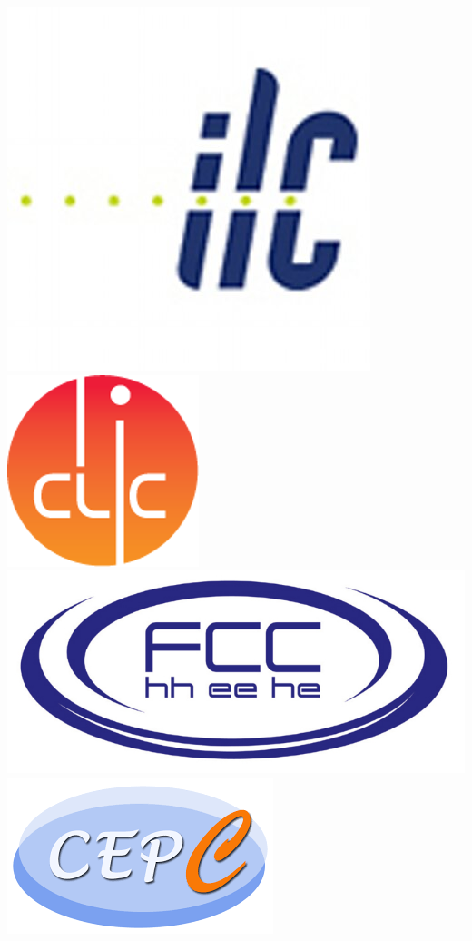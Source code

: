 \documentclass[aspectratio=169]{beamer}
\begin{document}
\begin{frame}
\begin{columns}[c]
    \includegraphics[width=0.4\linewidth]{figures/ilc_logo_400x400.jpg}\\
    \vspace*{-0.5cm}\hspace*{2cm}\includegraphics[width=0.4\linewidth]{figures/CLIC-Logo-Color-72_3_0.png}\\
    \includegraphics[width=0.6\linewidth]{figures/fcc_logo.jpg}\\
    \vspace*{-0.1cm}\hspace*{1.5cm}\includegraphics[width=0.6\linewidth]{figures/cepc-logo.png}\\
   \end{columns}
\end{frame}
\end{document}
